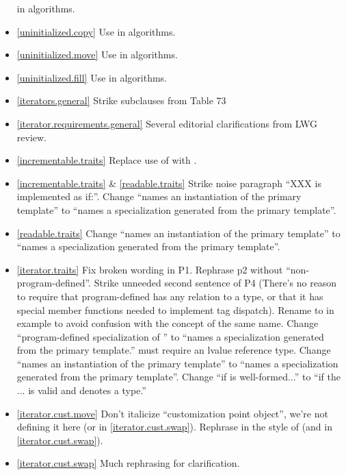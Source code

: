 \begin{itemize}
  in  algorithms.
\item \ref{uninitialized.copy} Use 
  in  algorithms.
\item \ref{uninitialized.move} Use 
  in  algorithms.
\item \ref{uninitialized.fill} Use 
  in  algorithms.
\item \ref{iterators.general} Strike subclauses from Table 73
\item \ref{iterator.requirements.general} Several editorial clarifications from
  LWG review.
\item \ref{incrementable.traits} Replace use of  with
  .
\item \ref{incrementable.traits} \& \ref{readable.traits} Strike noise paragraph
  ``XXX is implemented as if:''.
  Change ``names an instantiation of the primary template'' to
  ``names a specialization generated from the primary template''.
\item \ref{readable.traits}
  Change ``names an instantiation of the primary template'' to
  ``names a specialization generated from the primary template''.
\item \ref{iterator.traits} Fix broken wording in P1. Rephrase p2 without
  ``non-program-defined''. Strike unneeded second sentence of P4
  (There's no reason to require that program-defined 
  has any relation to a  type, or that it has special member
  functions needed to implement tag dispatch). Rename 
  to  in example to avoid confusion with the concept of the same name.
  Change ``program-defined specialization of ''
  to ``names a specialization generated from the primary template.''
   must require an lvalue reference
  type.
  Change ``names an instantiation of the primary template'' to
  ``names a specialization generated from the primary template''.
  Change ``if 
  is well-formed...'' to ``if the  ... is valid and
  denotes a type.''
\item \ref{iterator.cust.move} Don't italicize ``customization point
  object'', we're not defining it here
  (or in \ref{iterator.cust.swap}). Rephrase in the style of
   (and in
  \ref{iterator.cust.swap}).
\item \ref{iterator.cust.swap} Much rephrasing for clarification.

\end{itemize}
